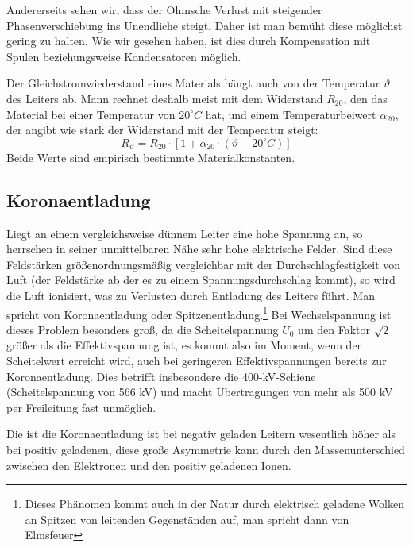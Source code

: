 Andererseits sehen wir, dass der Ohmsche Verlust mit steigender Phasenverschiebung ins Unendliche steigt. Daher ist man bemüht diese möglichst gering zu halten. Wie wir gesehen haben, ist dies durch Kompensation mit Spulen beziehungsweise Kondensatoren möglich.

Der Gleichstromwiederstand eines Materials hängt auch von der Temperatur $\vartheta$ des Leiters ab. Mann rechnet deshalb meist mit dem Widerstand $R_{20}$, den das Material bei einer Temperatur von $20^\circ C$ hat, und einem Temperaturbeiwert $\alpha_{20}$, der angibt wie stark der Widerstand mit der Temperatur steigt:
\begin{equation}
R_\vartheta = R_{20} \cdot \left[ 1 + \alpha_{20} \cdot \left( \vartheta - 20^\circ C \right) \right]
\end{equation}
Beide Werte sind empirisch bestimmte Materialkonstanten.



\subsection{Koronaentladung} %
Liegt an einem vergleichsweise dünnem Leiter eine hohe Spannung an, so herrschen in seiner unmittelbaren Nähe sehr hohe elektrische Felder.
Sind diese Feldstärken größenordnungsmäßig vergleichbar mit der Durchschlagfestigkeit von Luft (der Feldstärke ab der es zu einem Spannungsdurchschlag kommt), so wird die Luft ionisiert, was zu Verlusten durch Entladung des Leiters führt.\cite{BergmannSchaefer}
Man spricht von Koronaentladung oder Spitzenentladung.\footnote{Dieses Phänomen kommt auch in der Natur durch elektrisch geladene Wolken an Spitzen von leitenden Gegenständen auf, man spricht dann von Elmsfeuer\cite{BergmannSchaefer}}
Bei Wechselspannung ist dieses Problem besonders groß, da die Scheitelspannung $U_0$ um den Faktor $\sqrt{2}$ größer als die Effektivspannung ist, es kommt also im Moment, wenn der Scheitelwert erreicht wird, auch bei geringeren Effektivspannungen bereits zur Koronaentladung.
Dies betrifft insbesondere die 400-kV-Schiene (Scheitelspannung von 566 kV) und macht Übertragungen von mehr als 500 kV per Freileitung fast unmöglich.%

Die ist die Koronaentladung ist bei negativ geladen Leitern wesentlich höher als bei positiv geladenen\cite{Padiyar}, diese große Asymmetrie kann durch den Massenunterschied zwischen den Elektronen und den positiv geladenen Ionen. %